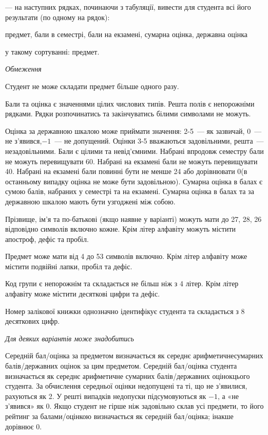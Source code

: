 \documentclass[11pt, ukrainian]{article}
\begin{document}
{\noindent}--- на наступних рядках, починаючи з табуляції, вивести для студента всі його результати (по одному на рядок):\par
предмет, бали в семестрі, бали на екзамені, сумарна оцінка, державна оцінка

{\noindent}у такому сортуванні: предмет.


\bigskip\textit{Обмеження}

Студент не може складати предмет більше одного разу.

Бали та оцінка є значеннями цілих числових типів. Решта полів є непорожніми рядками.
Рядки розпочинатись та закінчуватись білими символами не можуть.

Оцінка за державною шкалою може приймати значення: 2-5~--- як зазвичай, 0~--- не з’явився,$-1$~--- не допущений. 
Оцінки 3-5 вважаються задовільними, решта~--- незадовільними. 
Бали є цілими та невід’ємними.
Набрані впродовж семестру бали не можуть перевищувати 60. 
Набрані на екзамені бали не можуть перевищувати 40. 
Набрані на екзамені бали повинні бути не менше 24 або дорівнювати 0(в останньому випадку оцінка не може бути задовільною). 
Сумарна оцінка в балах є сумою балів, набраних у семестрі та на екзамені.
Сумарна оцінка в балах та за державною шкалою мають бути узгоджені між собою.

Прізвище, ім’я та по-батькові (якщо наявне у варіанті) можуть мати до 27, 28, 26 відповідно символів включно кожне. 
Крім літер алфавіту можуть містити апостроф, дефіс та пробіл.

Предмет може мати від 4 до 53 символів включно. 
Крім літер алфавіту може містити подвійні лапки, пробіл та дефіс.

Код групи є непорожнім та складається не більш ніж з 4 літер. 
Крім літер алфавіту може містити десяткові цифри та дефіс.


Номер залікової книжки однозначно ідентифікує студента та складається з 8 десяткових цифр. 

\bigskip\textit{Для деяких варіантів може знадобитись}

Середній бал/оцінка за предметом визначається як середнє арифметичнесумарних балів/державних оцінок за цим предметом. 
Середній бал/оцінка студента визначається як середнє арифметичне сумарних балів/державних оцінокцього студента. 
За обчислення середньої оцінки недопущені та ті, що не з’явилися, рахуються як 2.
У решті випадків недопуски підсумовуються як $-1$, а «не з’явився» як 0.
Якщо студент не гірше ніж задовільно склав усі предмети, 
то його рейтинг за балами/оцінкою визначається як середній бал/оцінка; інакше дорівнює 0.
\end{document}
